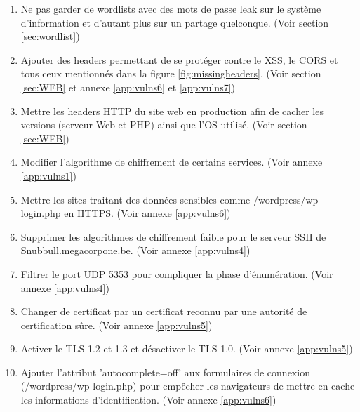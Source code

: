 \documentclass[a4paper]{article}
\begin{document}
\begin{enumerate}
    \item Ne pas garder de wordlists avec des mots de passe leak sur le système d'information et d'autant plus sur un partage quelconque. (Voir section \ref{sec:wordlist})
    
    \item Ajouter des headers permettant de se protéger contre le XSS, le CORS et tous ceux mentionnés dans la figure \ref{fig:missingheaders}. (Voir section \ref{sec:WEB} et annexe \ref{app:vulns6} et \ref{app:vulns7})
    
    \item Mettre les headers HTTP du site web en production afin de cacher les versions (serveur Web et PHP) ainsi que l'OS utilisé. (Voir section \ref{sec:WEB})
    
    \item Modifier l'algorithme de chiffrement de certains services. (Voir annexe \ref{app:vulns1})
    
    \item Mettre les sites traitant des données sensibles comme /wordpress/wp-login.php en HTTPS. (Voir annexe \ref{app:vulns6}) 
    
    \item Supprimer les algorithmes de chiffrement faible pour le serveur SSH de Snubbull.megacorpone.be. (Voir annexe \ref{app:vulns4})
    
    \item Filtrer le port UDP 5353 pour compliquer la phase d'énumération. (Voir annexe \ref{app:vulns4})
    
    \item Changer de certificat par un certificat reconnu par une autorité de certification sûre. (Voir annexe \ref{app:vulns5})
    
    \item Activer le TLS 1.2 et 1.3 et désactiver le TLS 1.0. (Voir annexe \ref{app:vulns5})
    
    \item Ajouter l'attribut 'autocomplete=off' aux formulaires de connexion (/wordpress/wp-login.php) pour empêcher les navigateurs de mettre en cache les informations d'identification. (Voir annexe \ref{app:vulns6})
    
\end{enumerate}
\end{document}

